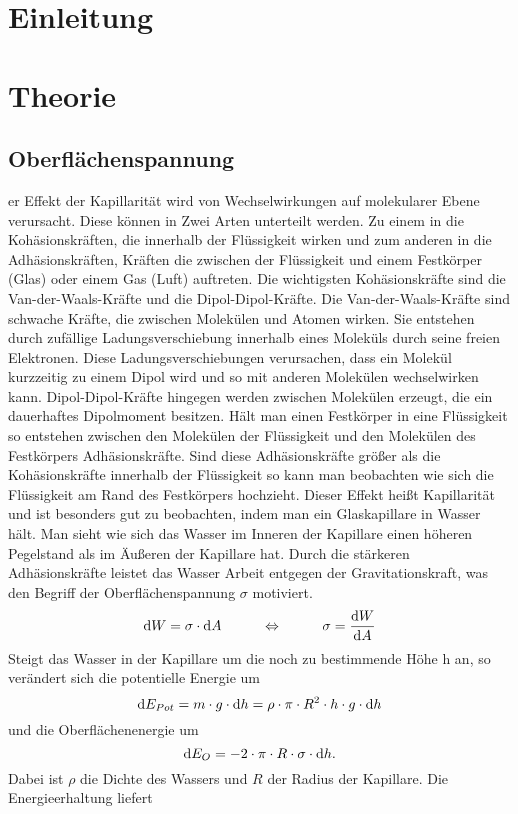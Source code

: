 \documentclass[12pt, a4paper, twoside]{scrartcl}
\begin{document}

\cleardoublepage
\tableofcontents
\cleardoublepage
\setcounter{page}{1}

\section{Einleitung}
\label{sec:einleitung}

\section{Theorie}
\label{sec:theorie}

\subsection{Oberflächenspannung}
er Effekt der Kapillarität wird von Wechselwirkungen auf molekularer Ebene verursacht. Diese können in Zwei Arten unterteilt werden. Zu einem in die Kohäsionskräften, die innerhalb der Flüssigkeit wirken und zum anderen in die Adhäsionskräften, Kräften die zwischen der Flüssigkeit und einem Festkörper (Glas) oder einem Gas (Luft) auftreten.\newline
\newline
Die wichtigsten Kohäsionskräfte sind die Van-der-Waals-Kräfte und die Dipol-Dipol-Kräfte. Die Van-der-Waals-Kräfte sind schwache Kräfte, die zwischen Molekülen und Atomen wirken. Sie entstehen durch zufällige Ladungsverschiebung innerhalb eines Moleküls durch seine freien Elektronen. Diese Ladungsverschiebungen verursachen, dass ein Molekül kurzzeitig zu einem Dipol wird und so mit anderen Molekülen wechselwirken kann. 
Dipol-Dipol-Kräfte hingegen werden zwischen Molekülen erzeugt, die ein dauerhaftes Dipolmoment besitzen.\newline
\newline
Hält man einen Festkörper in eine Flüssigkeit so entstehen zwischen den Molekülen der Flüssigkeit und den Molekülen des Festkörpers Adhäsionskräfte. Sind diese Adhäsionskräfte größer als die Kohäsionskräfte innerhalb der Flüssigkeit so kann man beobachten wie sich die Flüssigkeit am Rand des Festkörpers hochzieht. Dieser Effekt heißt Kapillarität und ist besonders gut zu beobachten, indem man ein Glaskapillare in Wasser hält. Man sieht wie sich das Wasser im Inneren der Kapillare einen höheren Pegelstand als im Äußeren der Kapillare hat. Durch die stärkeren Adhäsionskräfte leistet das Wasser Arbeit entgegen der Gravitationskraft, was den Begriff der Oberflächenspannung $\sigma$ motiviert. \[\textup dW=\sigma\cdot\textup dA\hspace{1cm}\Leftrightarrow\hspace{1cm}\sigma=\frac{\textup dW}{\textup dA}\] Steigt das Wasser in der Kapillare um die noch zu bestimmende Höhe h an, so verändert sich die potentielle Energie um \[\textup dE_{Pot}=m\cdot g\cdot\textup dh=\rho\cdot\pi\cdot R^2\cdot h\cdot g\cdot\textup dh\] und die Oberflächenenergie um \[\textup dE_{O}=-2\cdot\pi\cdot R\cdot\sigma\cdot\textup dh.\]Dabei ist $\rho$ die Dichte des Wassers und $R$ der Radius der Kapillare. Die Energieerhaltung liefert 
\end{document}
